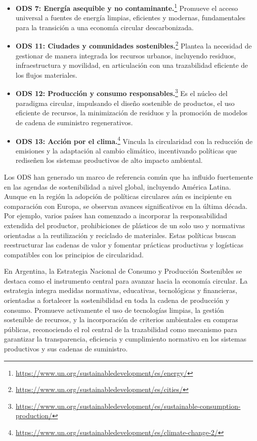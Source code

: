 \begin{itemize}
\item \textbf{ODS 7: Energía asequible y no contaminante.}\footnote{\url{https://www.un.org/sustainabledevelopment/es/energy/}} Promueve el acceso universal a fuentes de energía limpias, eficientes y modernas, fundamentales para la transición a una economía circular descarbonizada.
\item \textbf{ODS 11: Ciudades y comunidades sostenibles.}\footnote{\url{https://www.un.org/sustainabledevelopment/es/cities/}} Plantea la necesidad de gestionar de manera integrada los recursos urbanos, incluyendo residuos, infraestructura y movilidad, en articulación con una trazabilidad eficiente de los flujos materiales.
\item \textbf{ODS 12: Producción y consumo responsables.}\footnote{\url{https://www.un.org/sustainabledevelopment/es/sustainable-consumption-production/}} Es el núcleo del paradigma circular, impulsando el diseño sostenible de productos, el uso eficiente de recursos, la minimización de residuos y la promoción de modelos de cadena de suministro regenerativos.
\item \textbf{ODS 13: Acción por el clima.}\footnote{\url{https://www.un.org/sustainabledevelopment/es/climate-change-2/}} Vincula la circularidad con la reducción de emisiones y la adaptación al cambio climático, incentivando políticas que rediseñen los sistemas productivos de alto impacto ambiental.
\end{itemize}

Los ODS han generado un marco de referencia común que ha influido fuertemente en las agendas de sostenibilidad a nivel global, incluyendo América Latina. Aunque en la región la adopción de políticas circulares aún es incipiente en comparación con Europa, se observan avances significativos en la última década. Por ejemplo, varios países han comenzado a incorporar la responsabilidad extendida del productor, prohibiciones de plásticos de un solo uso y normativas orientadas a la reutilización y reciclado de materiales. Estas políticas buscan reestructurar las cadenas de valor y fomentar prácticas productivas y logísticas compatibles con los principios de circularidad.

En Argentina, la Estrategia Nacional de Consumo y Producción Sostenibles se destaca como el instrumento central para avanzar hacia la economía circular. La estrategia integra medidas normativas, educativas, tecnológicas y financieras, orientadas a fortalecer la sostenibilidad en toda la cadena de producción y consumo. Promueve activamente el uso de tecnologías limpias, la gestión sostenible de recursos, y la incorporación de criterios ambientales en compras públicas, reconociendo el rol central de la trazabilidad como mecanismo para garantizar la transparencia, eficiencia y cumplimiento normativo en los sistemas productivos y sus cadenas de suministro.

